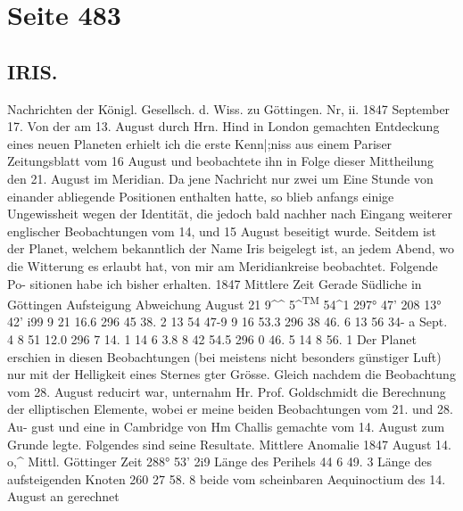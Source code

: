 \documentclass[10pt,a4paper]{article}
\begin{document}
\newpage
\section*{Seite 483}

\subsection*{IRIS.}

Nachrichten  der  Königl.  Gesellsch.  d.  Wiss.  zu  Göttingen.  Nr,  ii.     1847  September  17.
Von  der  am  13.  August  durch  Hrn.  Hind  in  London  gemachten  Entdeckung  eines  neuen  Planeten
erhielt  ich  die  erste  Kenn|;niss  aus  einem  Pariser  Zeitungsblatt  vom  16  August  und  beobachtete  ihn  in
Folge  dieser  Mittheilung  den  21.  August  im  Meridian.  Da  jene  Nachricht  nur  zwei  um  Eine  Stunde
von  einander  abliegende  Positionen  enthalten  hatte,  so  blieb  anfangs  einige  Ungewissheit  wegen  der
Identität,  die  jedoch  bald  nachher  nach  Eingang  weiterer  englischer  Beobachtungen  vom  14,  und  15
August  beseitigt  wurde.  Seitdem  ist  der  Planet,  welchem  bekanntlich  der  Name  Iris  beigelegt  ist,  an
jedem  Abend,  wo  die  Witterung  es  erlaubt  hat,  von  mir  am  Meridiankreise  beobachtet.  Folgende  Po-
sitionen habe  ich  bisher  erhalten.
1847
Mittlere  Zeit
Gerade
Südliche
in  Göttingen
Aufsteigung
Abweichung
August  21
9\textasciicircum{}\textasciicircum{}  5\textasciicircum{}\textsuperscript{TM}  54\textasciicircum{}1
297°  47'    20\glqq{}8
13°  42'    i9\glqq{}9
9     21     16.6
296    45     38. 2
13     54     47-9
9     16     53.3
296     38     46. 6
13     56     34- a
Sept.       4
8     51     12.0
296       7     14. 1
14       6       3.8
8     42     54.5
296       0    46. 5
14       8     56. 1
Der  Planet  erschien  in  diesen  Beobachtungen  (bei  meistens  nicht  besonders  günstiger  Luft)  nur
mit  der  Helligkeit  eines  Sternes  gter  Grösse.
Gleich  nachdem  die  Beobachtung  vom  28.  August  reducirt  war,  unternahm  Hr.  Prof.  Goldschmidt
die  Berechnung  der  elliptischen  Elemente,  wobei  er  meine  beiden  Beobachtungen  vom  21.  und  28.  Au-
gust und  eine  in  Cambridge  von  Hm  Challis  gemachte  vom  14.  August  zum  Grunde  legte.  Folgendes
sind  seine  Resultate.
Mittlere  Anomalie  1847  August  14.  o,\textasciicircum{}  Mittl.  Göttinger  Zeit  288°  53'    2i\glqq{}9
Länge  des  Perihels
44      6     49. 3
Länge  des  aufsteigenden  Knoten
260    27    58. 8
beide  vom  scheinbaren  Aequinoctium  des  14.  August  an  gerechnet
\end{document}
